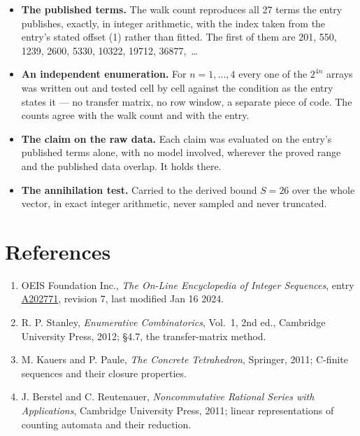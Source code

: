 \documentclass[11pt]{article}
\theoremstyle{definition}
\begin{document}
\begin{itemize}

\item {\bfseries The published terms.} The walk count reproduces all 27 terms the entry publishes, exactly, in integer arithmetic, with the index taken from the entry's stated offset (1) rather than fitted. The first of them are 201, 550, 1239, 2600, 5330, 10322, 19712, 36877,~\dots

\item {\bfseries An independent enumeration.} For $n = 1,\dots,4$ every one of the $2^{4n}$ arrays was written out and tested cell by cell against the condition as the entry states it --- no transfer matrix, no row window, a separate piece of code. The counts agree with the walk count and with the entry.

\item {\bfseries The claim on the raw data.} Each claim was evaluated on the entry's published terms alone, with no model involved, wherever the proved range and the published data overlap. It holds there.

\item {\bfseries The annihilation test.} Carried to the derived bound $S = 26$ over the whole vector, in exact integer arithmetic, never sampled and never truncated.

\end{itemize}

\section{References}

\begin{enumerate}

\item OEIS Foundation Inc., \emph{The On-Line Encyclopedia of Integer Sequences}, entry \href{https://oeis.org/A202771}{A202771}, revision 7, last modified Jan 16 2024.

\item R. P. Stanley, \emph{Enumerative Combinatorics}, Vol.~1, 2nd ed., Cambridge University Press, 2012; \S4.7, the transfer-matrix method.

\item M. Kauers and P. Paule, \emph{The Concrete Tetrahedron}, Springer, 2011; C-finite sequences and their closure properties.

\item J. Berstel and C. Reutenauer, \emph{Noncommutative Rational Series with Applications}, Cambridge University Press, 2011; linear representations of counting automata and their reduction.

\end{enumerate}
\end{document}
